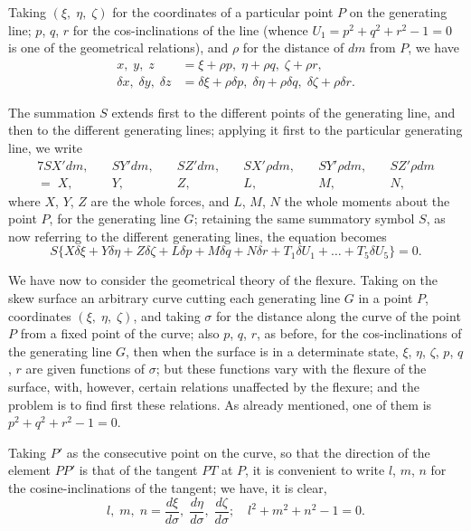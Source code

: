 \documentclass[11pt,a4paper,english]{article}
\theoremstyle{plain}
\begin{document}
Taking $(\xi,\; \eta,\; \zeta)$ for the coordinates of a particular point $P$ on the generating line; $p$, $q$, $r$ for the cos-inclinations of the line (whence $U_1 = p^2 + q^2 + r^2 - 1 = 0$ is one of the geometrical relations), and $\rho$ for the distance of $dm$ from $P$, we have
\begin{align*}
x,\; y,\; z &= \xi + \rho p,\; \eta + \rho q,\; \zeta + \rho r, \\
\delta x,\; \delta y,\; \delta z &= \delta\xi + \rho\delta p,\; \delta\eta + \rho\delta q,\; \delta\zeta + \rho\delta r.
\end{align*}

The summation $S$ extends first to the different points of the generating line, and then to the different generating lines; applying it first to the particular generating line, we write
\begin{alignat*}{7}
SX'dm,\quad &SY'dm,\quad &SZ'dm,\quad &SX'\rho dm,\quad &SY'\rho dm,\quad &SZ'\rho dm \\
=\; X,\quad &Y,\quad &Z,\quad &L,\quad &M,\quad &N,
\end{alignat*}
where $X$, $Y$, $Z$ are the whole forces, and $L$, $M$, $N$ the whole moments about the point $P$, for the generating line $G$; retaining the same summatory symbol $S$, as now referring to the different generating lines, the equation becomes
\[
S\{X\delta\xi + Y\delta\eta + Z\delta\zeta + L\delta p + M\delta q + N\delta r + T_1\delta U_1 + \ldots + T_5\delta U_5\} = 0.
\]

We have now to consider the geometrical theory of the flexure. Taking on the skew surface an arbitrary curve cutting each generating line $G$ in a point $P$, coordinates $(\xi,\; \eta,\; \zeta)$, and taking $\sigma$ for the distance along the curve of the point $P$ from a fixed point of the curve; also $p$, $q$, $r$, as before, for the cos-inclinations of the generating line $G$, then when the surface is in a determinate state, $\xi$, $\eta$, $\zeta$, $p$, $q$, $r$ are given functions of $\sigma$; but these functions vary with the flexure of the surface, with, however, certain relations unaffected by the flexure; and the problem is to find first these relations. As already mentioned, one of them is $p^2 + q^2 + r^2 - 1 = 0$.

Taking $P'$ as the consecutive point on the curve, so that the direction of the element $PP'$ is that of the tangent $PT$ at $P$, it is convenient to write $l$, $m$, $n$ for the cosine-inclinations of the tangent; we have, it is clear,
\[
l,\; m,\; n = \frac{d\xi}{d\sigma},\; \frac{d\eta}{d\sigma},\; \frac{d\zeta}{d\sigma};\quad l^2 + m^2 + n^2 - 1 = 0.
\]
\end{document}
